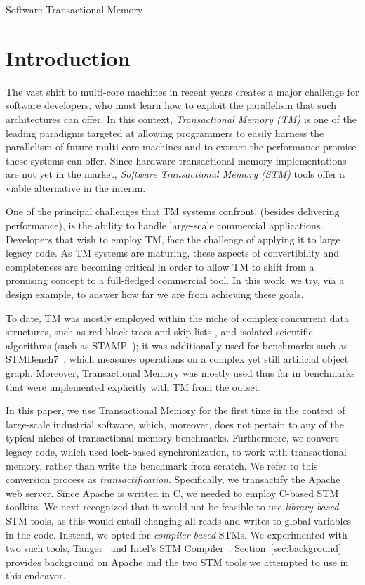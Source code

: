 \documentclass[preprint,11pt]{sigplanconf}
\let \cite = \citep
\begin{document}
\keywords
Software Transactional Memory

\section{Introduction}

The vast shift to multi-core machines in recent years 
creates a major challenge for software developers, 
who must learn how to exploit the parallelism that such
architectures can offer.
In this context, \emph{Transactional Memory (TM)} is one of the leading
paradigms targeted at allowing programmers to easily harness the 
parallelism of future multi-core machines and to extract the 
performance promise these systems can offer. 
Since hardware transactional memory implementations are not
yet in the market,  \emph{Software Transactional Memory (STM)} tools
offer a viable alternative in the interim. 

One of the principal challenges that TM systems confront, (besides 
delivering performance), is the ability to handle large-scale commercial applications.
Developers that wish to employ TM, face the challenge of 
applying it to large legacy code. As TM systems are maturing, these aspects of 
convertibility and completeness are becoming critical in order to allow TM to shift from 
a promising concept to a full-fledged commercial tool. In this work, we try, via a design 
example, to answer how far we are from achieving these goals. 

To date, TM was mostly employed within the niche of complex
concurrent data structures, such as red-black trees and skip lists
\cite{herlihy:DSTM, fraser:practical:thesis:2003}, and isolated scientific
algorithms (such as STAMP~\cite{caominh:stamp:iiswc:2008});
it was additionally used for  benchmarks such as
STMBench7~\cite{STMBench7}, which measures operations on a complex yet still
artificial object graph.
Moreover, Transactional Memory was mostly used thus far in benchmarks that 
were implemented explicitly with TM from the outset. 

In this paper, we use Transactional Memory
for the first time in the context of large-scale industrial software, which,
moreover, does not pertain to any of the typical niches of transactional memory
benchmarks. Furthermore, we convert legacy code, which used lock-based
synchronization, to work with transactional memory, rather than write the
benchmark from scratch. We refer to this conversion process as
\emph{transactification}. Specifically, we transactify the Apache 
web server. Since Apache is written in C, we needed to employ C-based
STM toolkits. We next recognized that it would not be feasible to
use \emph{library-based} STM tools, as this  
would entail changing all reads and writes to global variables in the code.
Instead, we opted for \emph{compiler-based} STMs. 
We experimented with two such tools, 
{\sc Tanger}~\cite{felber2007tanger} and Intel's STM Compiler~\cite{icc}.
Section~\ref{sec:background} provides background on Apache
and the two STM tools we attempted to use in this endeavor. 
\end{document}
